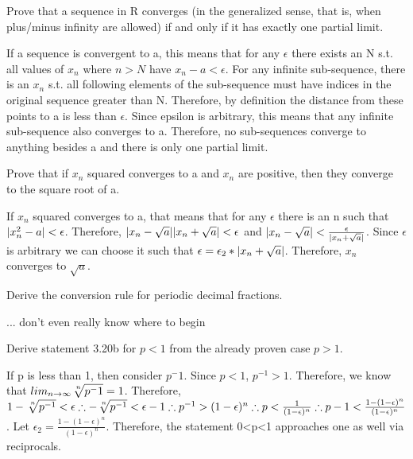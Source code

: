 \documentclass[12pt]{article}
\newenvironment{exercise}[2][Exercise]{\begin{trivlist}
\item[\hskip \labelsep {\bfseries #1}\hskip \labelsep {\bfseries #2.}]}{\end{trivlist}}
\begin{document}
\begin{exercise}{1.3}
Prove that a sequence in R converges (in the generalized sense, that is, when plus/minus infinity are allowed) if and only if it has exactly one partial limit. 
\end{exercise}
If a sequence is convergent to a, this means that for any $\epsilon$ there exists an N s.t. all values of $x_n$ where $n > N$ have $x_n - a < \epsilon$. For any infinite sub-sequence, there is an $x_n$ s.t. all following elements of the sub-sequence must have indices in the original sequence greater than N. Therefore, by definition the distance from these points to a is less than $\epsilon$. Since epsilon is arbitrary, this means that any infinite sub-sequence also converges to a. Therefore, no sub-sequences converge to anything besides a and there is only one partial limit. 

\begin{exercise}{2.1}
Prove that if $x_n$ squared converges to a and $x_n$ are positive, then they converge to the square root of a.
\end{exercise}
If $x_n$ squared converges to a, that means that for any $\epsilon$ there is an n such that $|x_{n}^2 - a| < \epsilon$. Therefore, $|x_n-\sqrt{a}||x_n+\sqrt{a}| < \epsilon$ and $|x_n-\sqrt{a}| < \frac{\epsilon}{|x_n+\sqrt{a}|}$. Since $\epsilon$ is arbitrary we can choose it such that $\epsilon = \epsilon_2*|x_n+\sqrt{a}|$. Therefore, $x_n$ converges to $\sqrt{a}$.

\begin{exercise}{2.2} 
Derive the conversion rule for periodic decimal fractions. 
\end{exercise}
... don't even really know where to begin

\begin{exercise}{2.3} 
Derive statement 3.20b for $p<1$ from the already proven case $p>1$.
\end{exercise}
If p is less than 1, then consider $p^-1$. Since $p < 1$, $p^{-1} > 1$. Therefore, we know that $lim_{n\to\infty}\sqrt[\leftroot{-2}\uproot{2}n]{p^-{1}} = 1$. Therefore, $1 - \sqrt[\leftroot{-2}\uproot{2}n]{p^{-1}} < \epsilon \therefore -\sqrt[\leftroot{-2}\uproot{2}n]{p^{-1}} < \epsilon - 1 \therefore p^{-1} > (1-\epsilon)^n \therefore p < \frac{1}{(1-\epsilon)^n} \therefore p - 1 < \frac{1-(1-\epsilon)^n}{(1-\epsilon)^n}$. Let $\epsilon_2 = \frac{1-(1-\epsilon)^n}{(1-\epsilon)^n}$. Therefore, the statement 0<p<1 approaches one as well via reciprocals.
\end{document}

